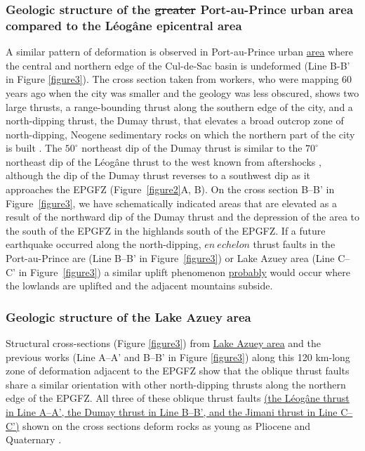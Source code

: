 \documentclass[linenumbers,draft]{agujournal}
\begin{document}
\subsubsection{Geologic structure of the \st{greater} Port-au-Prince urban area compared to the L\'eog\^ane epicentral area} 
A similar pattern of deformation is observed in Port-au-Prince urban \ul{area} where the central and northern edge of the Cul-de-Sac basin is undeformed \citep{massoni1955haiti,cox2011shear,mchugh2011offshore,saint2015seismotectonics} (Line B-B' in Figure \ref{figure3}). The cross section taken from workers, who were mapping 60 years ago when the city was smaller and the geology was less obscured, shows two large thrusts, a range-bounding thrust along the southern edge of the city, and a north-dipping thrust, the Dumay thrust, that elevates a broad outcrop zone of north-dipping, Neogene sedimentary rocks on which the northern part of the city is built \citep{rathje2014geotechnical}. The $50^{\circ}$ northeast dip of the Dumay thrust is similar to the $70^{\circ}$ northeast dip of the L\'eog\^ane thrust to the west known from aftershocks \citep{douilly2013crustal,douilly2015three}, although the dip of the Dumay thrust reverses to a southwest dip as it approaches the EPGFZ (Figure~\ref{figure2}A, B). On the cross section B--B' in Figure~\ref{figure3}, we have schematically indicated areas that are elevated as a result of the northward dip of the Dumay thrust and the depression of the area to the south of the EPGFZ in the highlands south of the EPGFZ. If a future earthquake occurred along the north-dipping, $en~echelon$ thrust faults in the Port-au-Prince are (Line B--B' in Figure~\ref{figure3}) or Lake Azuey area (Line C--C' in Figure~\ref{figure3}) a similar uplift phenomenon \ul{probably} would occur where the lowlands are uplifted and the adjacent mountains subside.

\subsubsection{Geologic structure of the Lake Azuey area} 
Structural cross-sections (Figure \ref{figure3}) from \ul{Lake Azuey area} and the previous works \citep{massoni1955haiti,bourgueil1988synthese,cox2011shear,douilly2015three} (Line A--A' and B--B' in Figure \ref{figure3}) along this 120 km-long zone of deformation adjacent to the EPGFZ show that the oblique thrust faults share a similar orientation with other north-dipping thrusts along the northern edge of the EPGFZ. All three of these oblique thrust faults \ul{(the L\'eog\^ane thrust in Line A--A', the Dumay thrust in Line B--B', and the Jimani thrust in Line C--C')} shown on the cross sections deform rocks as young as Pliocene and Quaternary \citep{saint2015seismotectonics}. 
\end{document}
